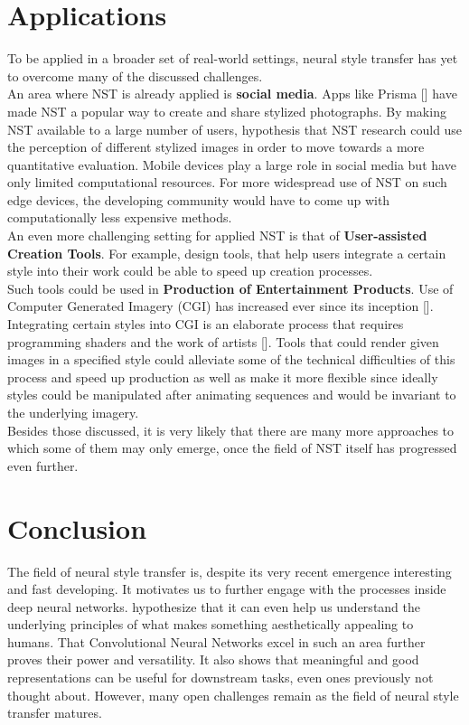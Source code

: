 \documentclass{seminar}
\begin{document}
	\section{Applications}
	To be applied in a broader set of real-world settings, neural style transfer has yet to overcome many of the discussed challenges.\\
	An area where NST is already applied is \textbf{social media}. Apps like Prisma [\cite{prisma}] have made NST a popular way to create and share stylized photographs. By making NST available to a large number of users, \cite{jing2019neural} hypothesis that NST research could use the perception of different stylized images in order to move towards a more quantitative evaluation. Mobile devices play a large role in social media but have only limited computational resources. For more widespread use of NST on such edge devices, the developing community would have to come up with computationally less expensive methods.\\
	An even more challenging setting for applied NST is that of \textbf{User-assisted Creation Tools}. For example, design tools, that help users integrate a certain style into their work could be able to speed up creation processes.\\
	Such tools could be used in \textbf{Production of Entertainment Products}. Use of Computer Generated Imagery (CGI) has increased ever since its inception [\cite{tucker2007movies}]. Integrating certain styles into CGI is an elaborate process that requires programming shaders and the work of artists [\cite{apodaca2000advanced}]. Tools that could render given images in a specified style could alleviate some of the technical difficulties of this process and speed up production as well as make it more flexible since ideally styles could be manipulated after animating sequences and would be invariant to the underlying imagery.\\
	Besides those discussed, it is very likely that there are many more approaches to which some of them may only emerge, once the field of NST itself has progressed even further.
	
	
	
	\section{Conclusion}
	The field of neural style transfer is, despite its very recent emergence interesting and fast developing. It motivates us to further engage with the processes inside deep neural networks. \cite{gatys2015neural} hypothesize that it can even help us understand the underlying principles of what makes something aesthetically appealing to humans. That Convolutional Neural Networks excel in such an area further proves their power and versatility. It also shows that meaningful and good representations can be useful for downstream tasks, even ones previously not thought about. However, many open challenges remain as the field of neural style transfer matures.
	
\end{document}
